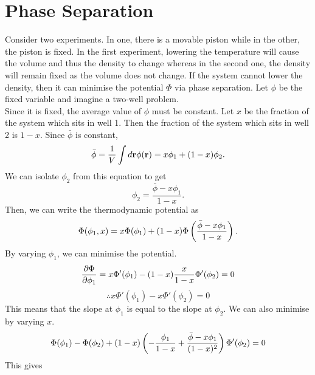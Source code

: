         \section{Phase Separation}
            Consider two experiments. In one, there is a movable piston while in the other, the piston is fixed. In the first experiment, lowering the temperature will cause the volume and thus the density to change whereas in the second one, the density will remain fixed as the volume does not change. If the system cannot lower the density, then it can minimise the potential $\Phi$ via phase separation. Let $\phi$ be the fixed variable and imagine a two-well problem. \\
            Since it is fixed, the average value of $\phi$ must be constant. Let $x$ be the fraction of the system which sits in well 1. Then the fraction of the system which sits in well 2 is $1-x$. Since $\bar{\phi}$ is constant,
            \begin{equation}
                \bar{\phi} = \frac{1}{V}\int d\mathbf{r}\phi(\mathbf{r}) = x\phi_1 + (1-x)\phi_2.
            \end{equation}
            We can isolate $\phi_2$ from this equation to get
            \begin{equation}
                \phi_2 = \frac{\bar{\phi}-x\phi_1}{1-x}.
            \end{equation}
            Then, we can write the thermodynamic potential as
            \begin{equation}
                \Phi(\phi_1,x) = x\Phi(\phi_1)+ (1-x)\Phi\left( \frac{\bar{\phi}-x\phi_1}{1-x} \right). 
            \end{equation}
            By varying $\phi_1$, we can minimise the potential.
            \begin{equation}
                \frac{\partial \Phi}{\partial \phi_1} = x\Phi'(\phi_1)-(1-x)\frac{x}{1-x}\Phi'(\phi_2)=0
            \end{equation}
            \begin{equation}
                \therefore x\Phi'(\phi_1)-x\Phi'(\phi_2)=0
            \end{equation}
            This means that the slope at $\phi_1$ is equal to the slope at $\phi_2$. We can also minimise by varying $x$.
            \begin{equation}
                \Phi(\phi_1)-\Phi(\phi_2)+(1-x)\left( -\frac{\phi_1}{1-x}+\frac{\bar{\phi}-x\phi_1}{(1-x)^2} \right)\Phi'(\phi_2)=0
            \end{equation} 
            This gives
